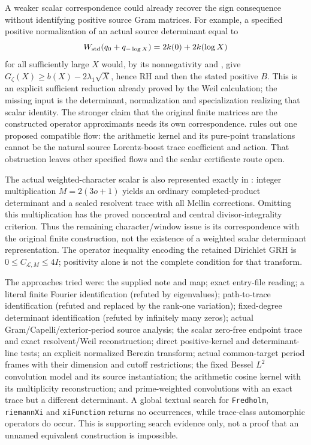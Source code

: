 A weaker scalar correspondence could already recover the sign consequence without identifying positive source Gram matrices. For example, a specified positive normalization of an actual source determinant equal to
\[
 W_{\rm std}(q_0+q_{-\log X})=2k(0)+2k(\log X)
\]
for all sufficiently large $X$ would, by its nonnegativity and , give
$G_\zeta(X)\ge b(X)-2\lambda_1\sqrt X$, hence RH and then the stated positive $B$. This is an explicit sufficient reduction already proved by the Weil calculation; the missing input is the determinant, normalization and specialization realizing that scalar identity. The stronger claim that the original finite matrices are the constructed operator approximants needs its own correspondence.  rules out one proposed compatible flow: the arithmetic kernel and its pure-point translations cannot be the natural source Lorentz-boost trace coefficient and action. That obstruction leaves other specified flows and the scalar certificate route open.

The actual weighted-character scalar is also represented exactly in : integer multiplication $M=2(3o+1)$ yields an ordinary completed-product determinant and a scaled resolvent trace with all Mellin corrections. Omitting this multiplication has the proved noncentral and central divisor-integrality criterion. Thus the remaining character/window issue is its correspondence with the original finite construction, not the existence of a weighted scalar determinant representation. The operator inequality encoding the retained Dirichlet GRH is $0\le C_{\mathcal L,M}\le4I$; positivity alone is not the complete condition for that transform.

The approaches tried were: the supplied note and map; exact entry-file reading; a literal finite Fourier identification (refuted by eigenvalues); path-to-trace identification (refuted and replaced by the rank-one variation); fixed-degree determinant identification (refuted by infinitely many zeros); actual Gram/Capelli/exterior-period source analysis; the scalar zero-free endpoint trace and exact resolvent/Weil reconstruction; direct positive-kernel and determinant-line tests; an explicit normalized Berezin transform; actual common-target period frames with their dimension and cutoff restrictions; the fixed Bessel $L^2$ convolution model and its source instantiation; the arithmetic cosine kernel with its multiplicity reconstruction; and prime-weighted convolutions with an exact trace but a different determinant. A global textual search for \texttt{Fredholm}, \texttt{riemannXi} and \texttt{xiFunction} returns no occurrences, while trace-class automorphic operators do occur. This is supporting search evidence only, not a proof that an unnamed equivalent construction is impossible.

